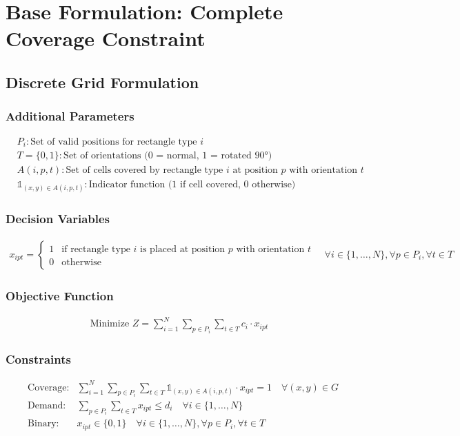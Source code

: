 \documentclass{article}
\begin{document}
\section{Base Formulation: Complete Coverage Constraint}

\subsection{Discrete Grid Formulation}

\subsubsection{Additional Parameters}
\begin{align*}
& P_i: \text{Set of valid positions for rectangle type } i \\
& T = \{0, 1\}: \text{Set of orientations (0 = normal, 1 = rotated 90°)} \\
& A(i,p,t): \text{Set of cells covered by rectangle type } i \text{ at position } p \text{ with orientation } t \\
& \mathbb{1}_{(x,y) \in A(i,p,t)}: \text{Indicator function (1 if cell covered, 0 otherwise)}
\end{align*}

\subsubsection{Decision Variables}
\begin{align*}
x_{ipt} = 
\begin{cases}
1 & \text{if rectangle type } i \text{ is placed at position } p \text{ with orientation } t \\
0 & \text{otherwise}
\end{cases}
\quad \forall i \in \{1,\ldots,N\}, \forall p \in P_i, \forall t \in T
\end{align*}

\subsubsection{Objective Function}
\begin{align*}
\text{Minimize } Z = \sum_{i=1}^{N} \sum_{p \in P_i} \sum_{t \in T} c_i \cdot x_{ipt}
\end{align*}

\subsubsection{Constraints}
\begin{align}
&\text{Coverage:} & \sum_{i=1}^{N} \sum_{p \in P_i} \sum_{t \in T} \mathbb{1}_{(x,y) \in A(i,p,t)} \cdot x_{ipt} = 1 \quad \forall (x,y) \in G \\
&\text{Demand:} & \sum_{p \in P_i} \sum_{t \in T} x_{ipt} \leq d_i \quad \forall i \in \{1, \ldots, N\} \\
&\text{Binary:} & x_{ipt} \in \{0,1\} \quad \forall i \in \{1,\ldots,N\}, \forall p \in P_i, \forall t \in T
\end{align}
\end{document}
